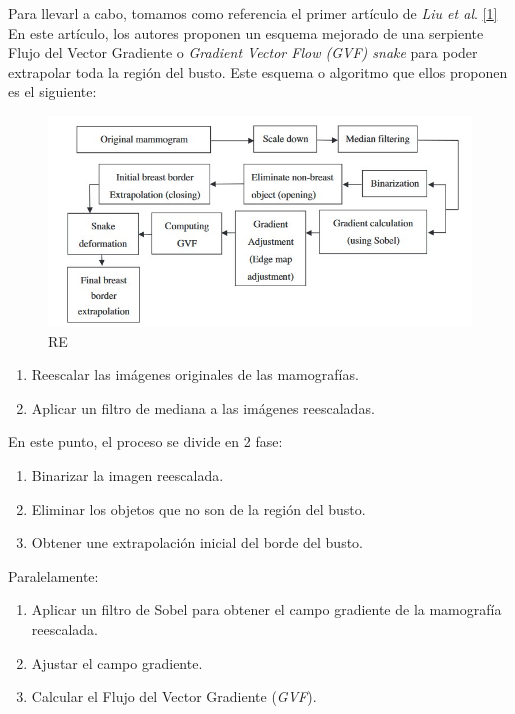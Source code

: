 \documentclass[
]{article}
\providecommand{\tightlist}{%
  \setlength{\itemsep}{0pt}\setlength{\parskip}{0pt}}
\begin{document}
Para llevarl a cabo, tomamos como referencia el primer artículo de
\emph{Liu et al}. \protect\hyperlink{ref}{{[}1{]}} En este artículo, los
autores proponen un esquema mejorado de una serpiente Flujo del Vector
Gradiente o \emph{Gradient Vector Flow (GVF) snake} para poder
extrapolar toda la región del busto. Este esquema o algoritmo que ellos
proponen es el siguiente:

\begin{figure}
\centering
\includegraphics{img/gvf_scheme.jpg}
\caption{RE}
\end{figure}

\begin{enumerate}
\def\labelenumi{\arabic{enumi}.}
\tightlist
\item
  Reescalar las imágenes originales de las mamografías.
\item
  Aplicar un filtro de mediana a las imágenes reescaladas.
\end{enumerate}

En este punto, el proceso se divide en 2 fase:

\begin{enumerate}
\def\labelenumi{\arabic{enumi}.}
\setcounter{enumi}{2}
\tightlist
\item
  Binarizar la imagen reescalada.
\item
  Eliminar los objetos que no son de la región del busto.
\item
  Obtener une extrapolación inicial del borde del busto.
\end{enumerate}

Paralelamente:

\begin{enumerate}
\def\labelenumi{\arabic{enumi}.}
\setcounter{enumi}{2}
\tightlist
\item
  Aplicar un filtro de Sobel para obtener el campo gradiente de la
  mamografía reescalada.
\item
  Ajustar el campo gradiente.
\item
  Calcular el Flujo del Vector Gradiente (\emph{GVF}).
\end{enumerate}
\end{document}
